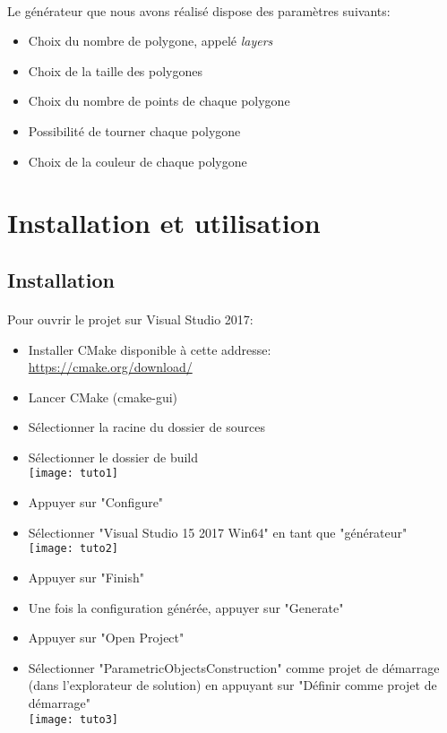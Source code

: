 \documentclass[article, backcover, french, nodocumentinfo]{upmethodology-document}
\begin{document}
		\paragraph*{}
			Le générateur que nous avons réalisé dispose des paramètres suivants:
			\begin{itemize}
				\item Choix du nombre de polygone, appelé \textit{layers}
				\item Choix de la taille des polygones
				\item Choix du nombre de points de chaque polygone
				\item Possibilité de tourner chaque polygone
				\item Choix de la couleur de chaque polygone
			\end{itemize}

	\section{Installation et utilisation}
		\subsection{Installation}
			\paragraph*{}
				Pour ouvrir le projet sur Visual Studio 2017:
				\begin{itemize}
					\item Installer CMake disponible à cette addresse:\\
						\url{https://cmake.org/download/}
					\item Lancer CMake (cmake-gui)
					\item Sélectionner la racine du dossier de sources
					\item Sélectionner le dossier de build \\
						\texttt{[image: tuto1]}
					\item Appuyer sur "Configure"
					\item Sélectionner "Visual Studio 15 2017 Win64" en tant que "générateur" \\
						\texttt{[image: tuto2]}
					\item Appuyer sur "Finish"
					\item Une fois la configuration générée, appuyer sur "Generate"
					\item Appuyer sur "Open Project"
					\item Sélectionner "ParametricObjectsConstruction" comme projet de démarrage (dans l'explorateur de solution) en appuyant sur "Définir comme projet de démarrage" \\
						\texttt{[image: tuto3]}
				\end{itemize}
\end{document}
